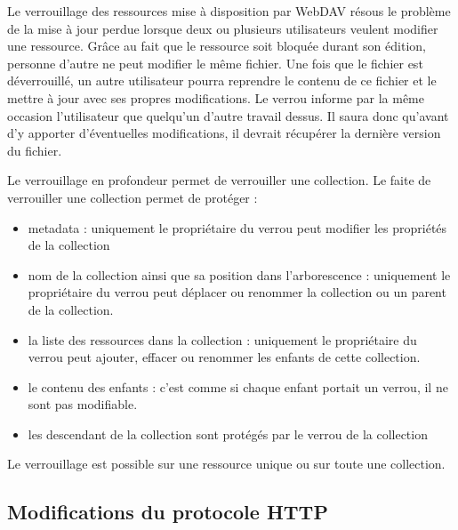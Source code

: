 \documentclass[a4paper, 11pt]{article}
\begin{document}
{		Le verrouillage des ressources mise à disposition par WebDAV résous le problème de la mise à jour perdue lorsque deux ou plusieurs utilisateurs veulent modifier une ressource. Grâce au fait que le ressource soit bloquée durant son édition, personne d'autre ne peut modifier le même fichier. Une fois que le fichier est déverrouillé, un autre utilisateur pourra reprendre le contenu de ce fichier et le mettre à jour avec ses propres modifications. Le verrou informe par la même occasion l'utilisateur que quelqu'un d'autre travail dessus. Il saura donc qu'avant d'y apporter d'éventuelles modifications, il devrait récupérer la dernière version du fichier. %
		
		
		Le verrouillage en profondeur permet de verrouiller une collection. Le faite de verrouiller une collection permet de protéger : 
		
		\begin{itemize}
			\item metadata : uniquement le propriétaire du verrou peut modifier les propriétés de la collection
			\item nom de la collection ainsi que sa position dans l'arborescence : uniquement le propriétaire du verrou peut déplacer ou renommer la collection ou un parent de la collection.
			\item la liste des ressources dans la collection : uniquement le propriétaire du verrou peut ajouter, effacer ou renommer les enfants de cette collection. 
			\item le contenu des enfants : c'est comme si chaque enfant portait un verrou, il ne sont pas modifiable. 
			\item les descendant de la collection sont protégés par le verrou de la collection
		
		\end{itemize}
		
		Le verrouillage est possible sur une ressource unique ou sur toute une collection.
		
		
	\subsection{Modifications du protocole HTTP}
	\label{sub:modif_proto_http}
		
}
\end{document}

